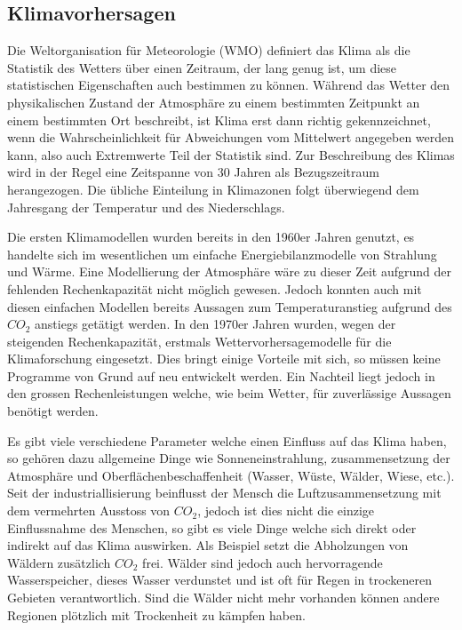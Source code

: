 \begin{refsection}
\subsection{Klimavorhersagen
\label{subsection:klima:entstehung}}
Die Weltorganisation für Meteorologie (WMO) definiert das Klima als die Statistik des Wetters über einen Zeitraum, der lang genug ist, um diese statistischen Eigenschaften auch bestimmen zu können. Während das Wetter den physikalischen Zustand der Atmosphäre zu einem bestimmten Zeitpunkt an einem bestimmten Ort beschreibt, ist Klima erst dann richtig gekennzeichnet, wenn die Wahrscheinlichkeit für Abweichungen vom Mittelwert angegeben werden kann, also auch Extremwerte Teil der Statistik sind. Zur Beschreibung des Klimas wird in der Regel eine Zeitspanne von 30 Jahren als Bezugszeitraum herangezogen. Die übliche Einteilung in Klimazonen folgt überwiegend dem Jahresgang der Temperatur und des Niederschlags. \cite{klima:maxplanck}

Die ersten Klimamodellen wurden bereits in den 1960er Jahren genutzt, es handelte sich im wesentlichen um einfache Energiebilanzmodelle von Strahlung und Wärme. Eine Modellierung der Atmosphäre wäre zu dieser Zeit aufgrund der fehlenden Rechenkapazität nicht möglich gewesen. Jedoch konnten auch mit diesen einfachen Modellen bereits Aussagen zum Temperaturanstieg aufgrund des $CO_2$ anstiegs getätigt werden. In den 1970er Jahren wurden, wegen der steigenden Rechenkapazität, erstmals Wettervorhersagemodelle für die Klimaforschung eingesetzt. Dies bringt einige Vorteile mit sich, so müssen keine Programme von Grund auf neu entwickelt werden. Ein Nachteil liegt jedoch in den grossen Rechenleistungen welche, wie beim Wetter, für zuverlässige Aussagen benötigt werden.
 
Es gibt viele verschiedene Parameter welche einen Einfluss auf das Klima haben, so gehören dazu  allgemeine Dinge wie Sonneneinstrahlung, zusammensetzung der Atmosphäre und Oberflächenbeschaffenheit (Wasser, Wüste, Wälder, Wiese, etc.). Seit der industriallisierung beinflusst der Mensch die Luftzusammensetzung mit dem vermehrten Ausstoss von $CO_2$, jedoch ist dies nicht die einzige Einflussnahme des Menschen, so gibt es viele Dinge welche sich direkt oder indirekt auf das Klima auswirken. Als Beispiel setzt die Abholzungen von Wäldern zusätzlich $CO_2$ frei. Wälder sind jedoch auch hervorragende Wasserspeicher, dieses Wasser verdunstet und ist oft für Regen in trockeneren Gebieten verantwortlich. Sind die Wälder nicht mehr vorhanden können andere Regionen plötzlich mit Trockenheit zu kämpfen haben.


\end{refsection}
